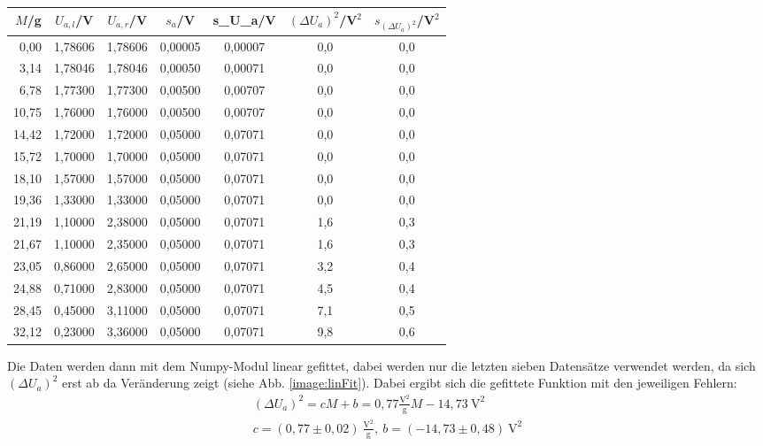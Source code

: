 \begin{center}
    \begin{tabular}{r|cccc|cc}
        $M$/g &  $U_{a,l}$/V &  $U_{a,r}$/V & $s_a$/V & s_{U_a}/V & $(\Delta U_a)^2$/V$^2$ &  $s_{(\Delta U_a)^2}$/V$^2$ \\
        \hline
         0,00  &  1,78606 &  1,78606 &   0,00005 &  0,00007 &  0,0 &     0,0 \\
         3,14  &  1,78046 &  1,78046 &   0,00050 &  0,00071 &  0,0 &     0,0 \\
         6,78  &  1,77300 &  1,77300 &   0,00500 &  0,00707 &  0,0 &     0,0 \\
        10,75  &  1,76000 &  1,76000 &   0,00500 &  0,00707 &  0,0 &     0,0 \\
        14,42  &  1,72000 &  1,72000 &   0,05000 &  0,07071 &  0,0 &     0,0 \\
        15,72  &  1,70000 &  1,70000 &   0,05000 &  0,07071 &  0,0 &     0,0 \\
        18,10  &  1,57000 &  1,57000 &   0,05000 &  0,07071 &  0,0 &     0,0 \\
        19,36  &  1,33000 &  1,33000 &   0,05000 &  0,07071 &  0,0 &     0,0 \\
        21,19  &  1,10000 &  2,38000 &   0,05000 &  0,07071 &  1,6 &     0,3 \\
        21,67  &  1,10000 &  2,35000 &   0,05000 &  0,07071 &  1,6 &     0,3 \\
        23,05  &  0,86000 &  2,65000 &   0,05000 &  0,07071 &  3,2 &     0,4 \\
        24,88  &  0,71000 &  2,83000 &   0,05000 &  0,07071 &  4,5 &     0,4 \\
        28,45  &  0,45000 &  3,11000 &   0,05000 &  0,07071 &  7,1 &     0,5 \\
        32,12  &  0,23000 &  3,36000 &   0,05000 &  0,07071 &  9,8 &     0,6 \\
    \end{tabular}
    \label{tab:gleichgewichtslage}
\end{center}
Die Daten werden dann mit dem Numpy-Modul linear gefittet, dabei werden nur die letzten sieben Datensätze verwendet werden, da sich $(\Delta U_a)^2$ erst ab da Veränderung zeigt (siehe Abb. \ref{image:linFit}). Dabei ergibt sich die gefittete Funktion mit den jeweiligen Fehlern:
\begin{gather}
    (\Delta U_a)^2 = c M + b = 0,77 \frac{\text{V}^2}{\text{g}} M - 14,73~\text{V}^2\\
    c = (0,77 \pm 0,02)~\frac{\text{V}^2}{\text{g}},~b = (-14,73 \pm 0,48)~\text{V}^2
\end{gather}
